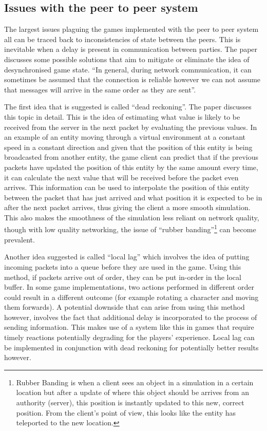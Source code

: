 \subsection{Issues with the peer to peer system}
The largest issues plaguing the games implemented with the peer to peer system all can be traced back to inconsistencies of state between the peers. This is inevitable when a delay is present in communication between parties. The paper  discusses some possible solutions that aim to mitigate or eliminate the idea of desynchronised game state. ``In general, during network communication, it can sometimes be assumed that the connection is reliable however we can not assume that messages will arrive in the same order as they are sent''.

The first idea that is suggested is called ``dead reckoning''. The paper  discusses this topic in detail. This is the idea of estimating what value is likely to be received from the server in the next packet by evaluating the previous values. In an example of an entity moving through a virtual environment at a constant speed in a constant direction and given that the position of this entity is being broadcasted from another entity, the game client can predict that if the previous packets have updated the position of this entity by the same amount every time, it can calculate the next value that will be received before the packet even arrives. This information can be used to interpolate the position of this entity between the packet that has just arrived and what position it is expected to be in after the next packet arrives, thus giving the client a more smooth simulation. This also makes the smoothness of the simulation less reliant on network quality, though with low quality networking, the issue of ``rubber banding''\footnote{Rubber Banding is when a client sees an object in a simulation in a certain location but after a update of where this object should be arrives from an authority (server), this position is instantly updated to this new, correct position. From the client's point of view, this looks like the entity has teleported to the new location.} can become prevalent.

Another idea suggested is called ``local lag'' which involves the idea of putting incoming packets into a queue before they are used in the game. Using this method, if packets arrive out of order, they can be put in-order in the local buffer. In some game implementations, two actions performed in different order could result in a different outcome (for example rotating a character and moving them forwards). A potential downside that can arise from using this method however, involves the fact that additional delay is incorporated to the process of sending information. This makes use of a system like this in games that require timely reactions potentially degrading for the players' experience. Local lag can be implemented in conjunction with dead reckoning for potentially better results however.

